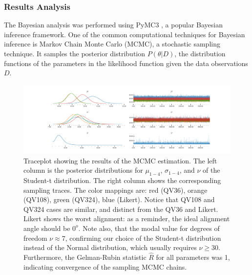 \subsubsection{Results Analysis}
    

The Bayesian analysis was performed using PyMC3 \cite{salvatier2016probabilistic}, 
a popular Bayesian inference framework. 
One of the common computational techniques 
for Bayesian inference is Markov Chain Monte Carlo (MCMC), 
a stochastic sampling technique. 
It samples the posterior distribution $P(\theta | D)$, 
the distribution functions of the parameters 
in the likelihood function given the data observations $D$. 


\begin{figure}
  \centering
  \includegraphics[trim= 2in 0in 2in 0in, clip, width=\textwidth, keepaspectratio=true]{content/image/StudentTIndep_VA_traceplot.pdf}
  \caption{
    Traceplot showing the results of the MCMC estimation. The left column is the posterior distributions for $\mu_{1-4}$, $\sigma_{1-4}$, and $\nu$ of the Student-t distribution. The right column shows the corresponding sampling traces. The color mappings are: red (QV36), orange (QV108), green (QV324), blue (Likert). Notice that QV108 and QV324 cases are similar, and distinct from the QV36 and Likert. Likert shows the worst alignment: as a reminder, the ideal alignment angle should be $0^o$. Note also, that the modal value for degrees of freedom $\nu \approx 7$, confirming our choice of the Student-t distribution instead of the Normal distribution, which usually requires $\nu \geq 30$. Furthermore, the Gelman-Rubin statistic $\hat{R}$ for all parameters was 1, indicating  convergence of the sampling MCMC chains.
  }
  \label{fig:traceplot_exp1}
\end{figure}


